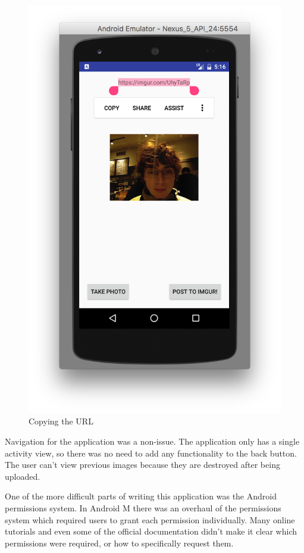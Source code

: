 \documentclass[12pt]{article}
\begin{document}
\begin{figure}[H]
    \includegraphics[scale=0.5]{./step4.png}
    \caption{Copying the URL}
\end{figure}


Navigation for the application was a non-issue. The application only has a single activity view, so there was no need to add any functionality to the back button. The user can't view previous images because they are destroyed after being uploaded.

One of the more difficult parts of writing this application was the Android permissions system. In Android M there was an overhaul of the permissions system which required users to grant each permission individually. Many online tutorials and even some of the official documentation didn't make it clear which permissions were required, or how to specifically request them.
\end{document}
